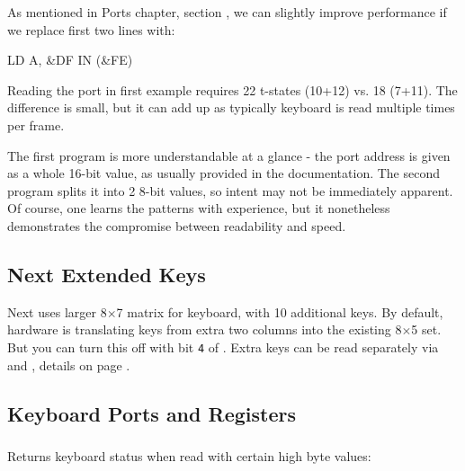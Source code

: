 As mentioned in Ports chapter, section , we can slightly improve performance if we replace first two lines with:

\begin{tcblisting}{}
    LD A, &DF
    IN (&FE)
\end{tcblisting}

Reading the port in first example requires 22 t-states (10+12) vs. 18 (7+11). The difference is small, but it can add up as typically keyboard is read multiple times per frame.

The first program is more understandable at a glance - the port address is given as a whole 16-bit value, as usually provided in the documentation. The second program splits it into 2 8-bit values, so intent may not be immediately apparent. Of course, one learns the patterns with experience, but it nonetheless demonstrates the compromise between readability and speed.


\subsection{Next Extended Keys}

Next uses larger 8$\times$7 matrix for keyboard, with 10 additional keys. By default, hardware is translating keys from extra two columns into the existing 8$\times$5 set. But you can turn this off with bit {\tt 4} of . Extra keys can be read separately via  and , details on page .


\subsection{Keyboard Ports and Registers}
\label{zx_next_keyboard_registers}

\subsubsection{}

\vspace*{-1em} %
Returns keyboard status when read with certain high byte values:

